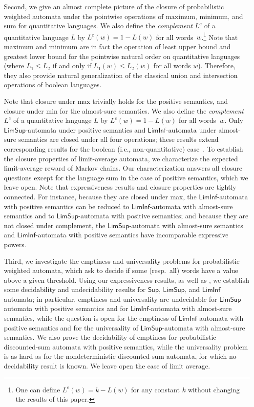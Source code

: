 \documentclass{llncs}
\newcommand{\Max}{\mathsf{Sup}}
\newcommand{\LimSup}{\mathsf{LimSup}}
\newcommand{\LimInf}{\mathsf{LimInf}}
\begin{document}
Second, we give an almost complete picture of the closure of
probabilistic weighted automata under the pointwise operations of
maximum, minimum, and sum for quantitative languages. We also define the
\emph{complement} $L^c$ of a quantitative language $L$ by $L^c(w) =
1-L(w)$ for all words~$w$.\footnote{One can define $L^c(w) = k-L(w)$ 
for any constant $k$ without changing the results of this paper.}
Note that maximum and minimum are in fact the operation of least upper bound and 
greatest lower bound for the pointwise natural order on quantitative languages
(where $L_1 \leq L_2$ if and only if $L_1(w) \leq L_2(w)$ for all words $w$).
Therefore, they also provide natural generalization of the classical union and
intersection operations of boolean languages.

Note that
closure under max trivially holds for the positive semantics, and
closure under min for the almost-sure semantics.  We also define the
\emph{complement} $L^c$ of a quantitative language $L$ by $L^c(w) =
1-L(w)$ for all words~$w$.  Only $\LimSup$-automata under positive
semantics and $\LimInf$-automata under almost-sure semantics are
closed under all four operations; these results extend corresponding
results for the boolean (i.e., non-quantitative) case~\cite{BG08}.  To
establish the closure properties of limit-average automata, we
characterize the expected limit-average reward of Markov chains.  Our
characterization answers all closure questions except for the language
sum in the case of positive semantics, which we leave open.  Note that
expressiveness results and closure properties are tightly connected.
For instance, because they are closed under max, the
$\LimInf$-automata with positive semantics can be reduced to
$\LimInf$-automata with almost-sure semantics and to
$\LimSup$-automata with positive semantics; and because they are not
closed under complement, the $\LimSup$-automata with almost-sure
semantics and $\LimInf$-automata with positive semantics have
incomparable expressive powers.

Third, we investigate the emptiness and universality problems for
probabilistic weighted automata, which ask to decide if some (resp.\
all) words have a value above a given threshold.  Using our
expressiveness results, as well as \cite{BG08,CDH08b}, we establish 
some decidability and undecidability results for $\Max$,
$\LimSup$, and $\LimInf$ automata; in particular, emptiness and
universality are undecidable for 
$\LimSup$-automata with positive semantics and for 
$\LimInf$-automata with almost-sure semantics,
while the question is open for 
the emptiness of $\LimInf$-automata with positive semantics and for 
the universality of $\LimSup$-automata with almost-sure semantics.
We also prove the decidability of emptiness for probabilistic 
discounted-sum automata with positive semantics,
while the universality problem is as hard as for the nondeterministic 
discounted-sum automata, for which no decidability result is known.
We leave open the case of limit average. 
\end{document}
